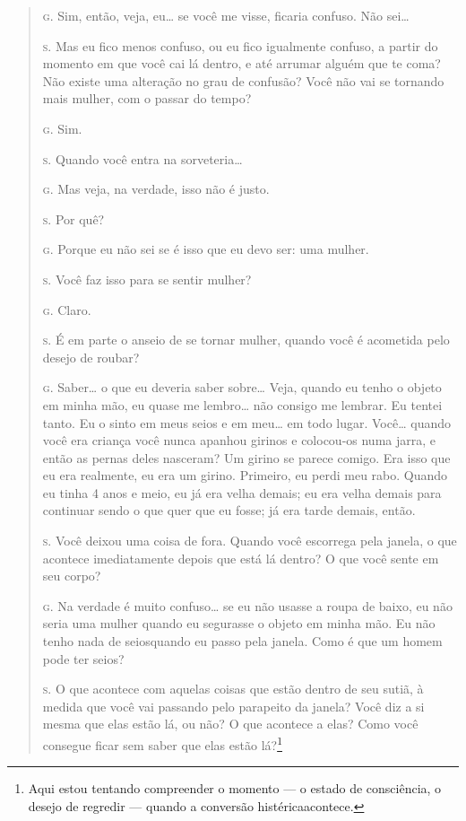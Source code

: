 \begin{quote}
\noindent\hskip0mm\textsc{g.} Sim, então, veja, eu\ldots{} se você me visse, ficaria confuso. Não sei\ldots{}

\noindent\hskip0mm\textsc{s.} Mas eu fico menos confuso, ou eu fico igualmente confuso, a partir do
momento em que você cai lá dentro, e até arrumar alguém que te coma?
Não existe uma alteração no grau de confusão? Você não vai se tornando
mais mulher, com o passar do tempo?

\noindent\hskip0mm\textsc{g.} Sim.

\noindent\hskip0mm\textsc{s.} Quando você entra na sorveteria\ldots{}

\noindent\hskip0mm\textsc{g.} Mas veja, na verdade, isso não é justo.

\noindent\hskip0mm\textsc{s.} Por quê?

\noindent\hskip0mm\textsc{g.} Porque eu não sei se é isso que eu devo ser: uma mulher.

\noindent\hskip0mm\textsc{s.} Você faz isso para se sentir mulher?

\noindent\hskip0mm\textsc{g.} Claro.

\noindent\hskip0mm\textsc{s.} É em parte o anseio de se tornar mulher, quando você é acometida
pelo desejo de roubar?

\noindent\hskip0mm\textsc{g.} Saber\ldots{} o que eu deveria saber sobre\ldots{} Veja, quando eu tenho o
objeto em minha mão, eu quase me lembro\ldots{} não consigo me lembrar. Eu
tentei tanto. Eu o sinto em meus seios e em meu\ldots{} em todo lugar.
Você\ldots{} quando você era criança você nunca apanhou girinos e colocou-os
numa jarra, e então as pernas deles nasceram?\idxidenhis{} Um girino se parece
comigo. Era isso que eu era realmente, eu era um girino. Primeiro, eu
perdi meu rabo. Quando eu tinha 4 anos e meio, eu já era velha demais;
eu era velha demais para continuar sendo o que quer que eu fosse; já
era tarde demais, então.

\noindent\hskip0mm\textsc{s.} Você deixou uma coisa de fora. Quando você escorrega pela janela, o
que acontece imediatamente depois que está lá dentro? O que você sente
em seu corpo?

\noindent\hskip0mm\textsc{g.} Na verdade é muito confuso\ldots{} se eu não usasse a roupa de baixo, eu
não seria uma mulher quando eu segurasse o objeto em minha mão. Eu não
tenho nada de seios\idxseios[|(] quando eu passo pela janela. Como é que um homem
pode ter seios?

\noindent\hskip0mm\textsc{s.} O que acontece com aquelas coisas que estão dentro de seu sutiã, à
medida que você vai passando pelo parapeito da janela? Você diz a si
mesma que elas estão lá, ou não? O que acontece a elas? Como você
consegue ficar sem saber que elas estão lá?\footnote{ Aqui estou
tentando compreender o momento --- o estado de consciência, o desejo
de regredir --- quando a conversão histérica\idxidenhis[|nn] acontece.}


\end{quote}
